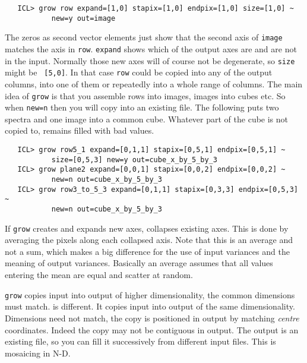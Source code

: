 \begin{verbatim}
   ICL> grow row expand=[1,0] stapix=[1,0] endpix=[1,0] size=[1,0] ~
           new=y out=image
\end{verbatim}

   The zeros as second vector elements just show that the second axis of
   {\tt image} matches the axis in {\tt row}.  {\tt expand} shows which
   of the output axes are and are not in the input.  Normally those new
   axes will of course not be degenerate, so {\tt size} might be {\tt
   [5,0]}.  In that case {\tt row} could be copied into any of the
   output columns, into one of them or repeatedly into a whole range of
   columns.  The main idea of {\tt grow} is that you assemble rows into
   images, images into cubes etc.  So when {\tt new=n} then you will
   copy into an existing file.  The following puts two spectra and one
   image into a common cube.  Whatever part of the cube is not copied
   to, remains filled with bad values.

\begin{verbatim}
   ICL> grow row5_1 expand=[0,1,1] stapix=[0,5,1] endpix=[0,5,1] ~
           size=[0,5,3] new=y out=cube_x_by_5_by_3
   ICL> grow plane2 expand=[0,0,1] stapix=[0,0,2] endpix=[0,0,2] ~
           new=n out=cube_x_by_5_by_3
   ICL> grow row3_to_5_3 expand=[0,1,1] stapix=[0,3,3] endpix=[0,5,3] ~
           new=n out=cube_x_by_5_by_3
\end{verbatim}


   If {\tt grow} creates and expands new axes,
{\tt{}}
   collapses existing axes.  This is done by averaging the pixels along
   each collapsed axis.  Note that this is an average and not a sum,
   which makes a big difference for the use of input variances and the
   meaning of output variances.  Basically an average assumes that all
   values entering the mean are equal and scatter at random.

   {\tt grow} copies input into output of higher dimensionality, the
   common dimensions must match.
{\tt{}}
   is different.  It copies input into output of the same
   dimensionality.  Dimensions need not match, the copy is positioned in
   output by matching {\it centre} coordinates.  Indeed the copy may not
   be contiguous in output.  The output is an existing file, so you can
   fill it successively from different input files.  This is mosaicing
   in N-D.

